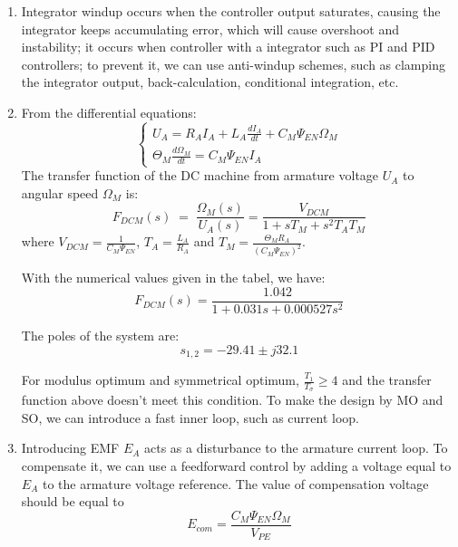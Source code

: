 \documentclass[12pt,a4paper, openany]{book}
\begin{document}
\begin{enumerate}
\item {\bf *}  Integrator windup occurs when the controller output saturates, causing the integrator keeps accumulating error, which will cause overshoot and instability; it occurs when controller with a integrator such as PI and PID controllers; to prevent it, we can use anti-windup schemes, such as clamping the integrator output, back-calculation, conditional integration, etc.
\item {\bf *} 
From the differential equations:
\begin{equation}
    \begin{cases}
    U_A = R_A I_A + L_A \frac{dI_A}{dt} + C_M \Psi_{EN} \Omega_M \\
    \Theta_M \frac{d \Omega_M}{dt}=C_M \Psi_{EN} I_A
    \end{cases}
\end{equation}
The transfer function of the DC machine from armature voltage $U_A$ to angular speed $\Omega_M$ is:
\begin{equation}
    F_{DCM}(s) \;=\; \frac{\Omega_M(s)}{U_A(s)} 
= \frac{V_{DCM}}{1 + sT_M + s^2 T_A T_M}
\end{equation}
where $V_{DCM} = \frac{1}{C_M \Psi_{EN}}$, $T_A = \frac{L_A}{R_A}$ and $T_M = \frac{\Theta_M R_A}{(C_M \Psi_{EN})^2}$.

With the numerical values given in the tabel, we have:
\begin{equation}
    F_{DCM}(s) = \frac{1.042}{1 + 0.031 s + 0.000527 s^2}        
\end{equation}

The poles of the system are:
\begin{equation}    
    s_{1,2} = -29.41 \pm j 32.1
\end{equation}

For modulus optimum and symmetrical optimum, $\frac{T_1}{T_\sigma} \geq 4$ and the transfer function above doesn't meet this condition. To make the design by MO and SO, we can introduce a fast inner loop, such as current loop.
\item {\bf *} Introducing EMF $E_A$ acts as a disturbance to the armature current loop. To compensate it, we can use a feedforward control by adding a voltage equal to $E_A$ to the armature voltage reference. The value of compensation voltage should be equal to 
\begin{equation}
  E_{com} =\frac{C_M \Psi_{EN} \Omega_M}{V_{PE}}  
\end{equation}

\end{enumerate}
\end{document}

